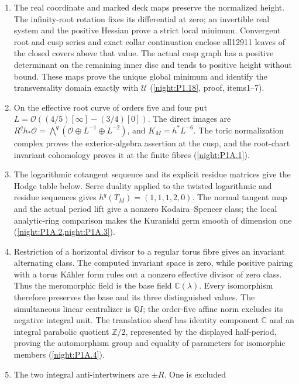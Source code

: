 \documentclass[11pt,a4paper]{article}
\theoremstyle{definition}
\begin{document}
\begin{enumerate}[label=\arabic*.]
\item The real coordinate and marked deck maps preserve the normalized
  height. The infinity-root rotation fixes its differential at zero;
  an invertible real system and the positive Hessian prove a strict
  local minimum. Convergent root and cusp series and exact collar
  continuation enclose all12911 leaves of the closed covers above
  that value. The actual cusp graph has a positive determinant on
  the remaining inner disc and tends to positive height without
  bound. These maps prove the unique global minimum and identify
  the transversality domain exactly with $\mathcal U$
  (\cref{night:P1.18}, proof, items1--7).
\item On the effective root curve of orders five and four put
  $L=\mathcal O((4/5)[\infty]-(3/4)[0])$.  The direct images are
  $R^qh_*\mathcal O=\bigwedge^q
  (\mathcal O\oplus L^{-1}\oplus L^{-2})$, and
  $K_M=h^*L^{-6}$.  The toric normalization complex proves the
  exterior-algebra assertion at the cusp, and the root-chart
  invariant cohomology proves it at the finite fibres
  (\cref{night:P1A.1}).
\item The logarithmic cotangent sequence and its explicit residue
  matrices give the Hodge table below.  Serre duality applied to
  the twisted logarithmic and residue sequences gives
  $h^q(T_M)=(1,1,1,2,0)$.  The normal tangent map and the actual
  period lift give a nonzero Kodaira--Spencer class; the local
  analytic-ring comparison makes the Kuranishi germ smooth of
  dimension one (\cref{night:P1A.2,night:P1A.3}).
\item Restriction of a horizontal divisor to a regular torus fibre
  gives an invariant alternating class.  The computed invariant
  space is zero, while positive pairing with a torus Kähler form
  rules out a nonzero effective divisor of zero class.  Thus the
  meromorphic field is the base field $\mathbb C(\lambda)$.
  Every isomorphism therefore preserves the base and its three
  distinguished values.  The simultaneous linear centralizer is
  $\mathbb Q I$; the order-five affine norm excludes its negative
  integral unit.  The translation sheaf has identity component
  $\mathbb C$ and an integral parabolic quotient $\mathbb Z/2$,
  represented by the displayed half-period, proving the
  automorphism group and equality of parameters for isomorphic
  members (\cref{night:P1A.4}).
\item The two integral anti-intertwiners are $\pm R$.  One is excluded

\end{enumerate}
\end{document}
